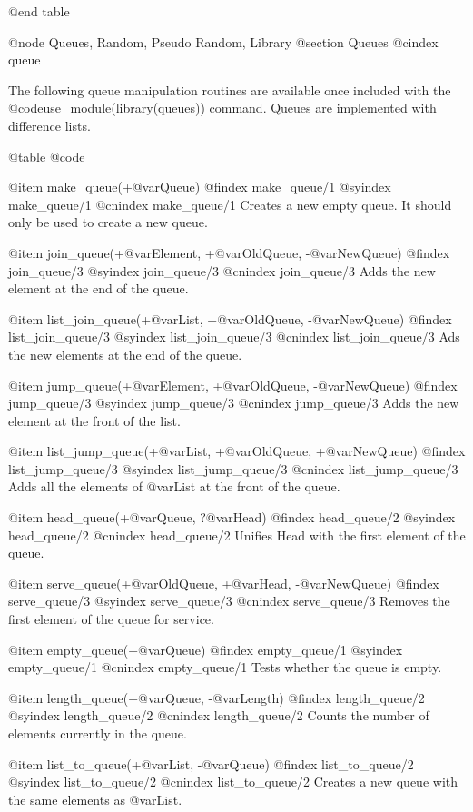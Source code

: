 {{{{{{{{{@end table

@node Queues, Random, Pseudo Random, Library
@section Queues
@cindex queue

The following queue manipulation routines are available once
included with the @code{use_module(library(queues))} command. Queues are
implemented with difference lists.

@table @code

@item make_queue(+@var{Queue})
@findex make_queue/1
@syindex make_queue/1
@cnindex make_queue/1
Creates a new empty queue. It should only be used to create a new queue.

@item join_queue(+@var{Element}, +@var{OldQueue}, -@var{NewQueue})
@findex join_queue/3
@syindex join_queue/3
@cnindex join_queue/3
Adds the new element at the end of the queue.

@item list_join_queue(+@var{List}, +@var{OldQueue}, -@var{NewQueue})
@findex list_join_queue/3
@syindex list_join_queue/3
@cnindex list_join_queue/3
Ads the new elements at the end of the queue.

@item jump_queue(+@var{Element}, +@var{OldQueue}, -@var{NewQueue})
@findex jump_queue/3
@syindex jump_queue/3
@cnindex jump_queue/3
Adds the new element at the front of the list.

@item list_jump_queue(+@var{List}, +@var{OldQueue}, +@var{NewQueue})
@findex list_jump_queue/3
@syindex list_jump_queue/3
@cnindex list_jump_queue/3
Adds all the elements of @var{List} at the front of the queue.

@item head_queue(+@var{Queue}, ?@var{Head})
@findex head_queue/2
@syindex head_queue/2
@cnindex head_queue/2
Unifies Head with the first element of the queue.

@item serve_queue(+@var{OldQueue}, +@var{Head}, -@var{NewQueue})
@findex serve_queue/3
@syindex serve_queue/3
@cnindex serve_queue/3
Removes the first element of the queue for service.

@item empty_queue(+@var{Queue})
@findex empty_queue/1
@syindex empty_queue/1
@cnindex empty_queue/1
Tests whether the queue is empty.

@item length_queue(+@var{Queue}, -@var{Length})
@findex length_queue/2
@syindex length_queue/2
@cnindex length_queue/2
Counts the number of elements currently in the queue.

@item list_to_queue(+@var{List}, -@var{Queue})
@findex list_to_queue/2
@syindex list_to_queue/2
@cnindex list_to_queue/2
Creates a new queue with the same elements as @var{List.}

}}}}}}}}}
